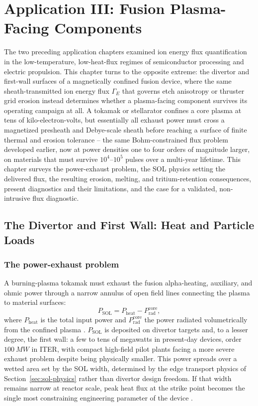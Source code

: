 \chapter{Application III: Fusion Plasma-Facing Components}
\label{ch:fusion-app}

The two preceding application chapters examined ion energy flux quantification in the low-temperature, low-heat-flux regimes of semiconductor processing and electric propulsion. This chapter turns to the opposite extreme: the divertor and first-wall surfaces of a magnetically confined fusion device, where the same sheath-transmitted ion energy flux $\Gamma_{E}$ that governs etch anisotropy or thruster grid erosion instead determines whether a plasma-facing component survives its operating campaign at all. A tokamak or stellarator confines a core plasma at tens of kilo-electron-volts, but essentially all exhaust power must cross a magnetized presheath and Debye-scale sheath before reaching a surface of finite thermal and erosion tolerance -- the same Bohm-constrained flux problem developed earlier, now at power densities one to four orders of magnitude larger, on materials that must survive $10^{4}$--$10^{5}$ pulses over a multi-year lifetime. This chapter surveys the power-exhaust problem, the SOL physics setting the delivered flux, the resulting erosion, melting, and tritium-retention consequences, present diagnostics and their limitations, and the case for a validated, non-intrusive flux diagnostic.

\section{The Divertor and First Wall: Heat and Particle Loads}

\subsection{The power-exhaust problem}

A burning-plasma tokamak must exhaust the fusion alpha-heating, auxiliary, and ohmic power through a narrow annulus of open field lines connecting the plasma to material surfaces:
\begin{equation}
P_{\mathrm{SOL}} = P_{\mathrm{heat}} - P_{\mathrm{rad}}^{\mathrm{core}},
\label{eq:powerbalance}
\end{equation}
where $P_{\mathrm{heat}}$ is the total input power and $P_{\mathrm{rad}}^{\mathrm{core}}$ the power radiated volumetrically from the confined plasma \cite{ref0093}. $P_{\mathrm{SOL}}$ is deposited on divertor targets and, to a lesser degree, the first wall: a few to tens of megawatts in present-day devices, order $\SI{100}{MW}$ in ITER, with compact high-field pilot plants facing a more severe exhaust problem despite being physically smaller. This power spreads over a wetted area set by the SOL width, determined by the edge transport physics of Section~\ref{sec:sol-physics} rather than divertor design freedom. If that width remains narrow at reactor scale, peak heat flux at the strike point becomes the single most constraining engineering parameter of the device \cite{ref0581}.

